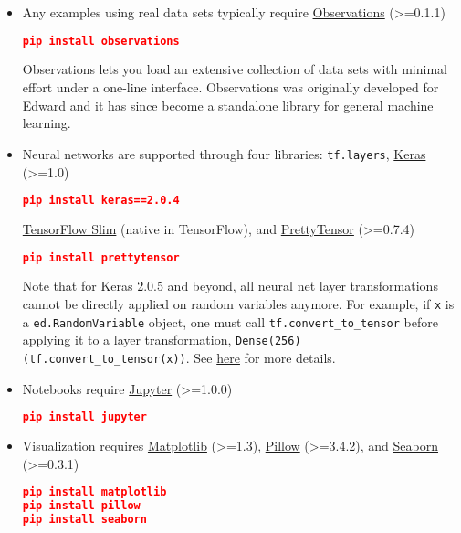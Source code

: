 \begin{itemize}
  \item Any examples using real data sets typically require
  \href{https://github.com/edwardlib/observations/}{Observations} (>=0.1.1)
\begin{lstlisting}[language=JSON]
pip install observations
\end{lstlisting}
Observations lets you load an extensive collection of data sets with
minimal effort under a one-line interface. Observations was originally
developed for Edward and it has since become a standalone library for
general machine learning.
  \item Neural networks are supported through four libraries:
  \texttt{tf.layers},
  \href{http://keras.io}{Keras} (>=1.0)
\begin{lstlisting}[language=JSON]
pip install keras==2.0.4
\end{lstlisting}
  \href{https://github.com/tensorflow/tensorflow/tree/master/tensorflow/contrib/slim}{TensorFlow Slim}
  (native in TensorFlow), and
  \href{https://github.com/google/prettytensor}{PrettyTensor} (>=0.7.4)
\begin{lstlisting}[language=JSON]
pip install prettytensor
\end{lstlisting}
Note that for Keras 2.0.5 and beyond, all neural net layer transformations cannot be directly applied on random variables anymore. For example, if \texttt{x} is a \texttt{ed.RandomVariable} object, one must call \texttt{tf.convert_to_tensor} before applying it to a layer transformation, \texttt{Dense(256)(tf.convert_to_tensor(x))}.
See \href{https://github.com/fchollet/keras/issues/6979}{here} for more details.
  \item Notebooks require
  \href{http://jupyter.org}{Jupyter} (>=1.0.0)
\begin{lstlisting}[language=JSON]
pip install jupyter
\end{lstlisting}
  \item Visualization requires
  \href{http://matplotlib.org}{Matplotlib} (>=1.3),
  \href{https://pillow.readthedocs.io}{Pillow} (>=3.4.2), and
  \href{https://seaborn.pydata.org}{Seaborn} (>=0.3.1)
\begin{lstlisting}[language=JSON]
pip install matplotlib
pip install pillow
pip install seaborn
\end{lstlisting}
\end{itemize}
